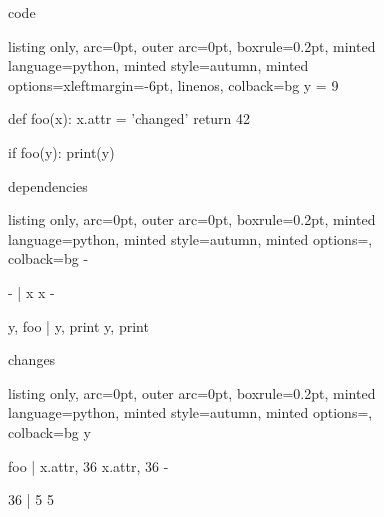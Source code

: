 \begin{figure}[!h]
 \begin{minipage}{0.32\textwidth}
 code
 \vspace{2pt}
  \begin{tcblisting}{listing only, 
    arc=0pt,
    outer arc=0pt, 
    boxrule=0.2pt,
    minted language=python,
    minted style=autumn,
    minted options={xleftmargin=-6pt, linenos},
    colback=bg }
y = 9

def foo(x):
    x.attr = 'changed'
    return 42

if foo(y):
    print(y) 
\end{tcblisting}
 \end{minipage}
 \begin{minipage}{0.32\textwidth}
 dependencies
  \begin{tcblisting}{listing only, 
    arc=0pt,
    outer arc=0pt, 
    boxrule=0.2pt,
    minted language=python,
    minted style=autumn,
    minted options={},
    colback=bg }
-

- | x
    x
    -

y, foo | y, print
         y, print 
\end{tcblisting}
 \end{minipage}
 \begin{minipage}{0.32\textwidth}
 changes
  \begin{tcblisting}{listing only, 
    arc=0pt,
    outer arc=0pt, 
    boxrule=0.2pt,
    minted language=python,
    minted style=autumn,
    minted options={},
    colback=bg }
y

foo | x.attr, 36
      x.attr, 36
      -

36 | 5
     5
\end{tcblisting}
 \end{minipage}
 \label{lst:clobbering}
\end{figure}